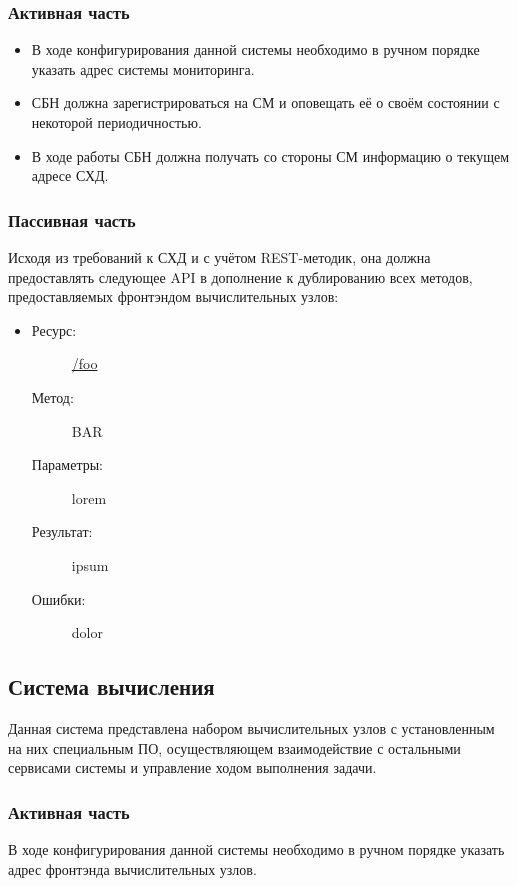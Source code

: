 \documentclass[a4paper,12pt]{report}
\numberwithin{equation}{section}
\begin{document}
\subsubsection{Активная часть}
\begin{itemize}
  \item В ходе конфигурирования данной системы необходимо в ручном порядке указать адрес системы мониторинга.
  \item СБН должна зарегистрироваться на СМ и оповещать её о своём состоянии с некоторой периодичностью.
  \item В ходе работы СБН должна получать со стороны СМ информацию о текущем адресе СХД.
\end{itemize}

\subsubsection{Пассивная часть}
Исходя из требований к СХД и с учётом REST-методик, она должна предоставлять следующее API в дополнение к дублированию всех методов, предоставляемых фронтэндом вычислительных узлов:

\begin{itemize}
  \item 
  \begin{description}
    \item[Ресурс:] \url{/foo}
    \item[Метод:] BAR
    \item[Параметры:] lorem
    \item[Результат:] ipsum
    \item[Ошибки:] dolor
  \end{description}
\end{itemize}

\subsection{Система вычисления}
Данная система представлена набором вычислительных узлов с установленным на них специальным ПО, 
осуществляющем взаимодействие с остальными сервисами системы и управление ходом выполнения задачи.

\subsubsection{Активная часть}
В ходе конфигурирования данной системы необходимо в ручном порядке указать адрес фронтэнда вычислительных узлов.
\end{document}
